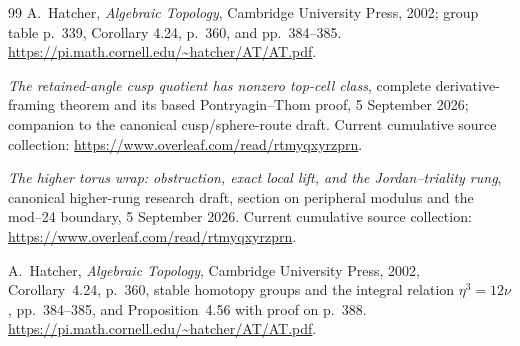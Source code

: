 \documentclass[11pt,letterpaper]{article}
\numberwithin{equation}{section}
\theoremstyle{definition}
\theoremstyle{remark}
\begin{document}
\begin{thebibliography}{99}
A.~Hatcher, \emph{Algebraic Topology}, Cambridge University Press,
2002; group table p.~339, Corollary 4.24, p.~360, and pp.~384--385.
\url{https://pi.math.cornell.edu/~hatcher/AT/AT.pdf}.

\emph{The retained-angle cusp quotient has nonzero top-cell class},
complete derivative-framing theorem and its based
Pontryagin--Thom proof, 5 September 2026;
companion to the canonical cusp/sphere-route draft.
Current cumulative source collection:
\url{https://www.overleaf.com/read/rtmyqxyrzprn}.

\emph{The higher torus wrap: obstruction, exact local lift, and the
Jordan--triality rung},
canonical higher-rung research draft, section on peripheral
modulus and the mod--24 boundary, 5 September 2026.
Current cumulative source collection:
\url{https://www.overleaf.com/read/rtmyqxyrzprn}.

A.~Hatcher, \emph{Algebraic Topology}, Cambridge University Press,
2002, Corollary~4.24, p.~360, stable homotopy groups and the
integral relation \(\eta^3=12\nu\), pp.~384--385,
and Proposition~4.56 with proof on p.~388.
\url{https://pi.math.cornell.edu/~hatcher/AT/AT.pdf}.

\end{thebibliography}
\endgroup



\end{document}

